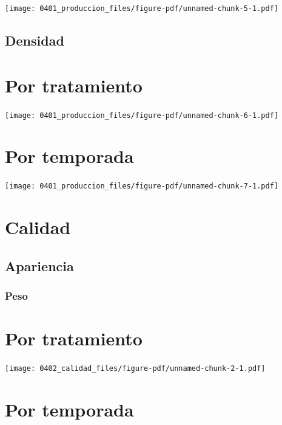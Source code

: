 \documentclass[
  letterpaper,
  DIV=11,
  numbers=noendperiod]{scrreprt}
\begin{document}
\begin{center}
\texttt{[image: 0401\_produccion\_files/figure-pdf/unnamed-chunk-5-1.pdf]}
\end{center}

\section{Densidad}\label{densidad-1}

\chapter{Por tratamiento}

\begin{center}
\texttt{[image: 0401\_produccion\_files/figure-pdf/unnamed-chunk-6-1.pdf]}
\end{center}

\chapter{Por temporada}

\begin{center}
\texttt{[image: 0401\_produccion\_files/figure-pdf/unnamed-chunk-7-1.pdf]}
\end{center}

\chapter{Calidad}\label{calidad-1}

\section{Apariencia}\label{apariencia-1}

\subsection{Peso}\label{peso-1}

\chapter{Por tratamiento}

\begin{center}
\texttt{[image: 0402\_calidad\_files/figure-pdf/unnamed-chunk-2-1.pdf]}
\end{center}

\chapter{Por temporada}
\end{document}
